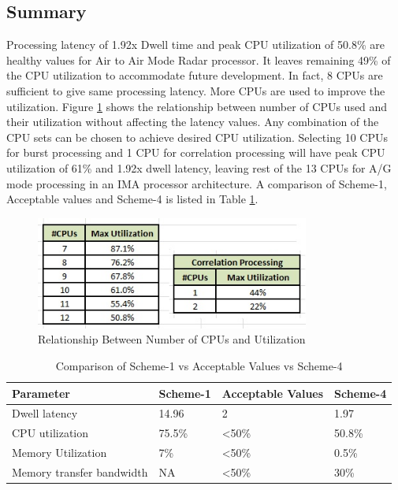 \subsection{Summary}
\label{ss:mm:scheme5:summary}

Processing latency of 1.92x Dwell time and peak CPU utilization of 50.8\% are healthy values for Air to Air Mode Radar processor. It leaves remaining 49\% of the CPU utilization to accommodate future development. In fact, 8 CPUs are sufficient to give same processing latency. More CPUs are used to improve the utilization. Figure \ref{fig:mm:scheme5_summary} shows the relationship between number of CPUs used and their utilization without affecting the latency values. Any combination of the CPU sets can be chosen to achieve desired CPU utilization. Selecting 10 CPUs for burst processing and 1 CPU for correlation processing will have peak CPU utilization of 61\% and 1.92x dwell latency, leaving rest of the 13 CPUs for A/G mode processing in an IMA processor architecture. A comparison of  Scheme-1, Acceptable values and Scheme-4 is listed in Table \ref{tbl:mm:scheme5_comparison}.

\begin{figure}[h!]
	\centering
	\includegraphics[width=90mm]{figures/scheme5_summary}
	\caption{Relationship Between Number of CPUs and Utilization}
	\label{fig:mm:scheme5_summary}
\end{figure}

\begin{table}[h!]
	\centering
	\begin{tabular}{|l|l|l|l|} 
	 \hline
	 \textbf{Parameter} & \textbf{Scheme-1} & \textbf{Acceptable Values} & \textbf{Scheme-4}\\
	 \hline
	 Dwell latency &  14.96 & 2 & 1.97 \\ \hline
	 CPU utilization & 75.5\% & \textless 50\% & 50.8\% \\ \hline
	 Memory Utilization & 7\% & \textless 50\%  & 0.5\% \\ \hline
	 Memory transfer bandwidth & NA & \textless 50\% & 30\%  \\ \hline
	\end{tabular}
	\caption{Comparison of Scheme-1 vs Acceptable Values vs Scheme-4}
	\label{tbl:mm:scheme5_comparison}
\end{table}


